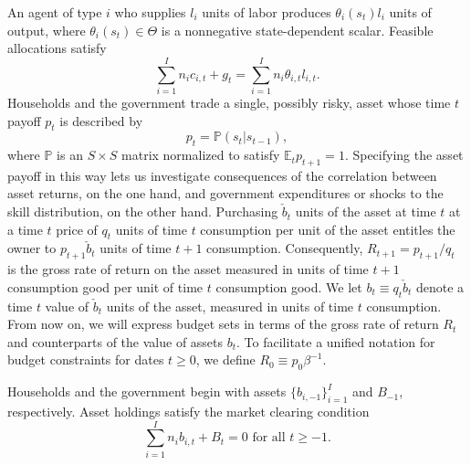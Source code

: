 \documentclass[thmsb,11pt]{article}
\begin{document}
An agent of type $i$ who supplies $l_{i}$ units of labor produces
$\theta_{i}\left(s_{t}\right)l_{i}$ units of output, where $\theta_{i}(s_{t})\in\Theta$
is a nonnegative state-dependent scalar. Feasible allocations satisfy
\begin{equation}
\label{eqn:feasiblity}
\sum_{i=1}^{I}n_{i}c_{i,t}+g_{t}=\sum_{i=1}^{I}n_{i}\theta_{i,t}l_{i,t}.
\end{equation}
\color{black}
Households and the government  trade a single, possibly risky, asset whose
\color{black}
time $t$ payoff $p_{t}$  is described by
\[
p_{t}=\mathbb{P}(s_{t}|s_{t-1}),
\]
where  $\mathbb{P}$ is an $S\times S$ matrix normalized to satisfy $\mathbb{E}_{t}p_{t+1}=1$.
Specifying the asset payoff in this way lets  us  investigate  consequences  of the correlation between asset returns, on the one hand,
and government expenditures or shocks to the skill distribution,  on the other hand.
Purchasing $\check b_t$ units of the asset at time $t$ at a time $t$ price of $q_t$ units of time $t$ consumption per unit of the asset
entitles the owner to $p_{t+1} \check b_t$ units of time $t+1$ consumption.  Consequently, $R_{t+1} = p_{t+1} / q_t$ is the gross rate of
return on the asset measured in units of time $t+1$ consumption good per unit of time $t$ consumption good.  We let $b_t \equiv q_t \check b_t$ denote
a time $t$ value of $\check b_t$ units of the asset, measured in units of time $t$ consumption.  From now on, we will express
 budget sets in terms of the gross rate of return $R_t$ and  counterparts of the value of assets $b_t$.
To facilitate a unified notation for budget constraints for dates $t \geq 0$, we define $R_0 \equiv p_0 \beta^{-1}$.
\color{black}

Households and the government begin with  assets $%
\{b_{i,-1}\}_{i=1}^{I}$ and $B_{-1}$, respectively. Asset holdings
satisfy the market clearing condition%
\begin{equation}
\label{feasibility bonds}
\sum_{i=1}^{I}n _{i}b_{i,t}+B_{t}=0\text{ for all }t\geq -1.
\end{equation}%
\color{black}

\end{document}
